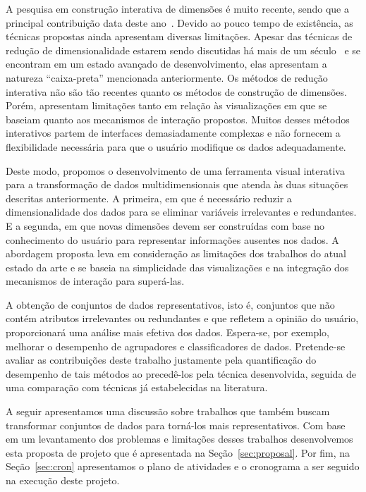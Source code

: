 A pesquisa em construção interativa de dimensões é muito
recente, sendo que a principal contribuição data deste
ano~\cite{Gladys2013}. Devido ao pouco tempo de existência, as
técnicas propostas ainda apresentam diversas limitações.
Apesar das técnicas de redução de dimensionalidade estarem
sendo discutidas há mais de um século~\cite{Pearson1901} e se
encontram em um estado avançado de desenvolvimento, elas 
apresentam a natureza ``caixa-preta'' mencionada
anteriormente.  Os métodos de redução interativa não são tão
recentes quanto os métodos de construção de dimensões.
Porém, apresentam limitações tanto em relação às
visualizações em que se baseiam quanto aos mecanismos de
interação propostos.  Muitos desses métodos interativos
partem de interfaces demasiadamente complexas e não fornecem
a flexibilidade necessária para que o usuário modifique os
dados adequadamente.

Deste modo, propomos o desenvolvimento de uma ferramenta
visual interativa para a transformação de dados
multidimensionais que atenda às duas situações descritas
anteriormente. A primeira, em que é necessário reduzir a
dimensionalidade dos dados para se eliminar variáveis
irrelevantes e redundantes. E a segunda, em que novas
dimensões devem ser construídas com base no conhecimento do
usuário para representar informações ausentes nos dados. A
abordagem proposta leva em consideração as limitações dos
trabalhos do atual estado da arte e se baseia na
simplicidade das visualizações e na integração  dos
mecanismos de interação para superá-las. 

A obtenção de conjuntos de dados representativos, isto é,
conjuntos que não contém atributos irrelevantes ou
redundantes e que refletem a opinião do usuário,
proporcionará uma análise mais efetiva dos dados. Espera-se,
por exemplo, melhorar o desempenho de agrupadores e
classificadores de dados. Pretende-se avaliar as
contribuições deste trabalho justamente pela quantificação
do desempenho de tais métodos ao precedê-los pela técnica
desenvolvida, seguida de uma comparação com técnicas já
estabelecidas na literatura.

A seguir apresentamos uma
discussão sobre trabalhos que também buscam transformar
conjuntos de dados para torná-los mais representativos. Com
base em um levantamento dos problemas e limitações desses
trabalhos desenvolvemos esta proposta de projeto que é
apresentada na Seção~\ref{sec:proposal}. Por fim, na
Seção~\ref{sec:cron} apresentamos o plano de atividades e o
cronograma a ser seguido na execução deste projeto.

